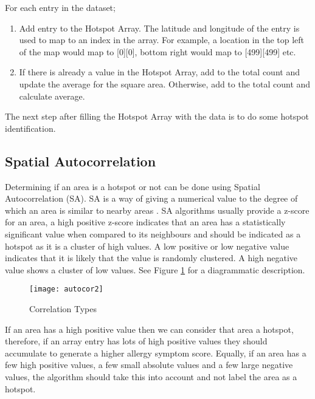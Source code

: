 For each entry in the dataset;

\begin{enumerate}
    \item Add entry to the Hotspot Array. The latitude and longitude of the entry is used to map to an index in the array. For example, a location in the top left of the map would map to [0][0], bottom right would map to [499][499] etc. 
    \item If there is already a value in the Hotspot Array, add to the total count and update the average for the square area. Otherwise, add to the total count and calculate average.
\end{enumerate}

The next step after filling the Hotspot Array with the data is to do some hotspot identification.

\subsection{Spatial Autocorrelation}

Determining if an area is a hotspot or not can be done using Spatial Autocorrelation (SA). SA is a way of giving a numerical value to the degree of which an area is similar to nearby areas \cite{autocor}. SA algorithms usually provide a z-score for an area, a high positive z-score indicates that an area has a statistically significant value when compared to its neighbours and should be indicated as a hotspot as it is a cluster of high values. A low positive or low negative value indicates that it is likely that the value is randomly clustered. A high negative value shows a cluster of low values. See Figure \ref{fig:autocor2} for a diagrammatic description.\\

\begin{figure}[H]
\begin{center}
\texttt{[image: autocor2]}
\caption{Correlation Types \cite{ytcorr}}
\label{fig:autocor2}
\end{center}
\end{figure}

If an area has a high positive value then we can consider that area a hotspot, therefore, if an array entry has lots of high positive values they should accumulate to generate a higher allergy symptom score. Equally, if an area has a few high positive values, a few small absolute values and a few large negative values, the algorithm should take this into account and not label the area as a hotspot.\\

